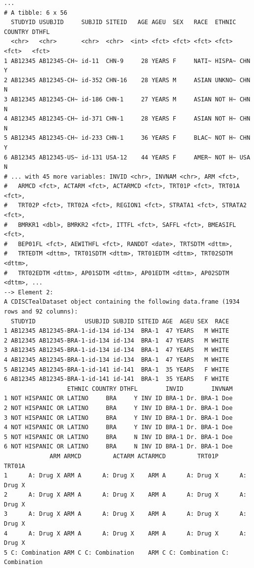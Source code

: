 \documentclass[
  letterpaper,
  DIV=11,
  numbers=noendperiod]{scrreprt}
\begin{document}
\begin{verbatim}
...
# A tibble: 6 x 56
  STUDYID USUBJID     SUBJID SITEID   AGE AGEU  SEX   RACE  ETHNIC COUNTRY DTHFL
  <chr>   <chr>       <chr>  <chr>  <int> <fct> <fct> <fct> <fct>  <fct>   <fct>
1 AB12345 AB12345-CH~ id-11  CHN-9     28 YEARS F     NATI~ HISPA~ CHN     Y    
2 AB12345 AB12345-CH~ id-352 CHN-16    28 YEARS M     ASIAN UNKNO~ CHN     N    
3 AB12345 AB12345-CH~ id-186 CHN-1     27 YEARS M     ASIAN NOT H~ CHN     N    
4 AB12345 AB12345-CH~ id-371 CHN-1     28 YEARS F     ASIAN NOT H~ CHN     N    
5 AB12345 AB12345-CH~ id-233 CHN-1     36 YEARS F     BLAC~ NOT H~ CHN     Y    
6 AB12345 AB12345-US~ id-131 USA-12    44 YEARS F     AMER~ NOT H~ USA     N    
# ... with 45 more variables: INVID <chr>, INVNAM <chr>, ARM <fct>,
#   ARMCD <fct>, ACTARM <fct>, ACTARMCD <fct>, TRT01P <fct>, TRT01A <fct>,
#   TRT02P <fct>, TRT02A <fct>, REGION1 <fct>, STRATA1 <fct>, STRATA2 <fct>,
#   BMRKR1 <dbl>, BMRKR2 <fct>, ITTFL <fct>, SAFFL <fct>, BMEASIFL <fct>,
#   BEP01FL <fct>, AEWITHFL <fct>, RANDDT <date>, TRTSDTM <dttm>,
#   TRTEDTM <dttm>, TRT01SDTM <dttm>, TRT01EDTM <dttm>, TRT02SDTM <dttm>,
#   TRT02EDTM <dttm>, AP01SDTM <dttm>, AP01EDTM <dttm>, AP02SDTM <dttm>, ...
--> Element 2:
A CDISCTealDataset object containing the following data.frame (1934 rows and 92 columns):
  STUDYID              USUBJID SUBJID SITEID AGE  AGEU SEX  RACE
1 AB12345 AB12345-BRA-1-id-134 id-134  BRA-1  47 YEARS   M WHITE
2 AB12345 AB12345-BRA-1-id-134 id-134  BRA-1  47 YEARS   M WHITE
3 AB12345 AB12345-BRA-1-id-134 id-134  BRA-1  47 YEARS   M WHITE
4 AB12345 AB12345-BRA-1-id-134 id-134  BRA-1  47 YEARS   M WHITE
5 AB12345 AB12345-BRA-1-id-141 id-141  BRA-1  35 YEARS   F WHITE
6 AB12345 AB12345-BRA-1-id-141 id-141  BRA-1  35 YEARS   F WHITE
                  ETHNIC COUNTRY DTHFL        INVID        INVNAM
1 NOT HISPANIC OR LATINO     BRA     Y INV ID BRA-1 Dr. BRA-1 Doe
2 NOT HISPANIC OR LATINO     BRA     Y INV ID BRA-1 Dr. BRA-1 Doe
3 NOT HISPANIC OR LATINO     BRA     Y INV ID BRA-1 Dr. BRA-1 Doe
4 NOT HISPANIC OR LATINO     BRA     Y INV ID BRA-1 Dr. BRA-1 Doe
5 NOT HISPANIC OR LATINO     BRA     N INV ID BRA-1 Dr. BRA-1 Doe
6 NOT HISPANIC OR LATINO     BRA     N INV ID BRA-1 Dr. BRA-1 Doe
             ARM ARMCD         ACTARM ACTARMCD         TRT01P         TRT01A
1      A: Drug X ARM A      A: Drug X    ARM A      A: Drug X      A: Drug X
2      A: Drug X ARM A      A: Drug X    ARM A      A: Drug X      A: Drug X
3      A: Drug X ARM A      A: Drug X    ARM A      A: Drug X      A: Drug X
4      A: Drug X ARM A      A: Drug X    ARM A      A: Drug X      A: Drug X
5 C: Combination ARM C C: Combination    ARM C C: Combination C: Combination

\end{verbatim}
\end{document}
